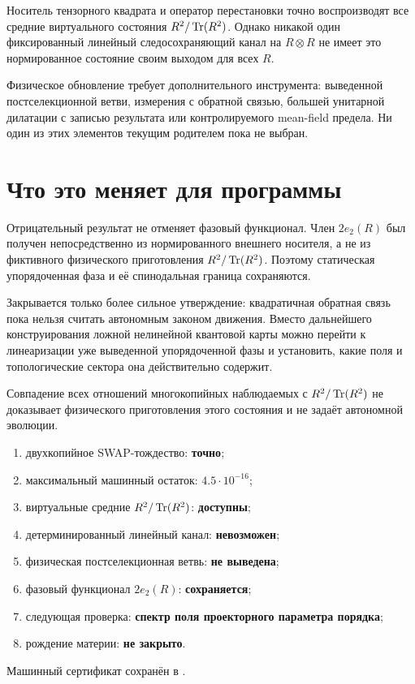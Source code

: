 \begin{theorem}
Носитель тензорного квадрата и оператор перестановки точно воспроизводят все
средние виртуального состояния $R^2/\operatorname{Tr}(R^2)$. Однако никакой один
фиксированный линейный следосохраняющий канал на $R\otimes R$ не имеет это
нормированное состояние своим выходом для всех $R$.
\end{theorem}

Физическое обновление требует дополнительного инструмента: выведенной
постселекционной ветви, измерения с обратной связью, большей унитарной
дилатации с записью результата или контролируемого mean-field предела.
Ни один из этих элементов текущим родителем пока не выбран.

\section{Что это меняет для программы}

Отрицательный результат не отменяет фазовый функционал. Член
$2e_2(R)$ был получен непосредственно из нормированного внешнего носителя,
а не из фиктивного физического приготовления $R^2/\operatorname{Tr}(R^2)$. Поэтому
статическая упорядоченная фаза и её спинодальная граница сохраняются.

Закрывается только более сильное утверждение: квадратичная обратная связь пока
нельзя считать автономным законом движения. Вместо дальнейшего
конструирования ложной нелинейной квантовой карты можно перейти к
линеаризации уже выведенной упорядоченной фазы и установить, какие поля и
топологические сектора она действительно содержит.

\begin{nogocriterion}
Совпадение всех отношений многокопийных наблюдаемых с
$R^2/\operatorname{Tr}(R^2)$ не доказывает физического приготовления этого состояния и
не задаёт автономной эволюции.
\end{nogocriterion}

\begin{protocol}
\begin{enumerate}
 \item двухкопийное SWAP-тождество: \textbf{точно};
 \item максимальный машинный остаток: \textbf{$4.5\cdot10^{-16}$};
 \item виртуальные средние $R^2/\operatorname{Tr}(R^2)$: \textbf{доступны};
 \item детерминированный линейный канал: \textbf{невозможен};
 \item физическая постселекционная ветвь: \textbf{не выведена};
 \item фазовый функционал $2e_2(R)$: \textbf{сохраняется};
 \item следующая проверка: \textbf{спектр поля проекторного параметра порядка};
 \item рождение материи: \textbf{не закрыто}.
\end{enumerate}
\end{protocol}

Машинный сертификат сохранён в
.